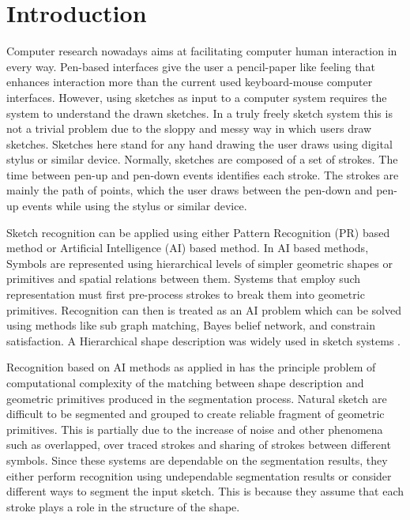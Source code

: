 \documentclass[preprint,10pt,5p,twocolumn]{elsarticle}
\begin{document}
\section{Introduction}

Computer research nowadays aims at facilitating computer human interaction in every way. Pen-based interfaces give the user a pencil-paper like feeling that enhances interaction more than the current used keyboard-mouse computer interfaces. However, using sketches as input to a computer system requires the system to understand the drawn sketches. In a truly freely sketch system this is not a trivial problem due to the sloppy and messy way in which users draw sketches. Sketches here stand for any hand drawing the user draws using digital stylus or similar device. Normally, sketches are composed of a set of strokes. The time between pen-up and pen-down events identifies each stroke. The strokes are mainly the path of points, which the user draws between the pen-down and pen-up events while using the stylus or similar device. 

Sketch recognition can be applied using either Pattern Recognition (PR) based method or Artificial Intelligence (AI) based method. In AI based methods, Symbols are represented using hierarchical levels of simpler geometric shapes or primitives and spatial relations between them. Systems that employ such representation must first pre-process strokes to break them into geometric primitives. Recognition can then is treated as an AI problem which can be solved using methods like sub graph matching, Bayes belief network, and constrain satisfaction. A Hierarchical shape description was widely used in sketch systems \cite{HierarchicalParsing7,SketchRead2007}.  %


Recognition based on AI methods as applied in \cite{SketchRead2007} has the principle problem of computational complexity of the matching between shape description and geometric primitives produced in the segmentation process. Natural sketch are difficult to be segmented and grouped to create reliable fragment of geometric primitives. This is partially due to the increase of noise and other phenomena such as overlapped, over traced strokes and sharing of strokes between different symbols. Since these systems are dependable on the segmentation results, they either perform recognition using undependable segmentation results or consider different ways to segment the input sketch. This is because they assume that each stroke plays a role in the structure of the shape. 
\end{document}
